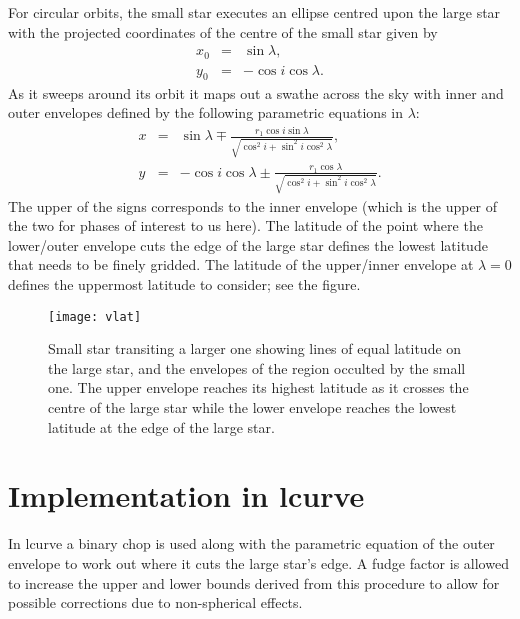 \documentclass[10pt,a4paper]{article}
\begin{document}
For circular orbits, the small star executes an ellipse centred upon 
the large star with the projected coordinates of the centre of the small star
given by
\begin{eqnarray*}
x_0 &=& \sin \lambda,\\
y_0 &=& -\cos i \cos \lambda.
\end{eqnarray*}
As it sweeps around its orbit it maps out a swathe across the sky
with inner and outer envelopes defined by the following parametric 
equations in $\lambda$:
\begin{eqnarray*}
x &=& \sin \lambda \mp \frac{r_1 \cos i \sin \lambda}{\sqrt{\cos^2 i + \sin^2
    i \cos^2 \lambda}},\\
y &=& -\cos i \cos \lambda \pm \frac{r_1 \cos \lambda}{\sqrt{\cos^2 i + \sin^2
    i \cos^2 \lambda}}.
\end{eqnarray*}
The upper of the signs corresponds to the inner envelope (which is the upper
of the two for phases of interest to us here). The latitude of
the point where the lower/outer envelope cuts the edge of the large star defines the 
lowest latitude that needs to be finely gridded. The latitude of the upper/inner
envelope at $\lambda = 0$ defines the uppermost latitude to consider; see the figure.
\begin{figure}
\texttt{[image: vlat]}
\caption{Small star transiting a larger one showing lines of equal latitude on the large
star, and the envelopes of the region occulted by the small one. The upper
envelope reaches its highest latitude as it crosses the centre of the large
star while the lower envelope reaches the lowest latitude at the edge of the
large star.}
\end{figure}

\section{Implementation in lcurve}
In lcurve a binary chop is used along with the parametric equation of the
outer envelope to work out where it cuts the large star's edge. A fudge factor
is allowed to increase the upper and lower bounds derived from this procedure
to allow for possible corrections due to non-spherical effects.
\end{document}
